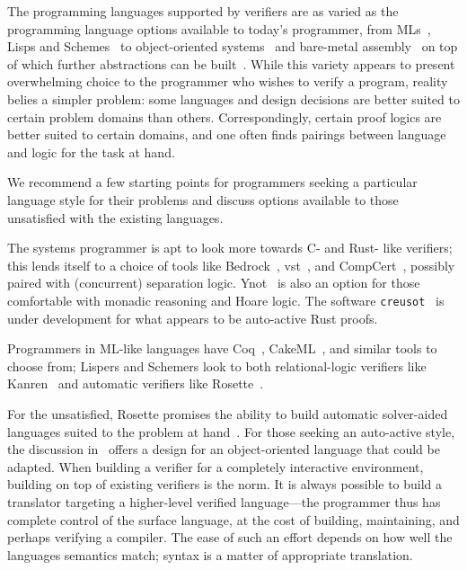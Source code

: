 The programming languages supported by verifiers are as varied as the
programming language options available to today's programmer, from
MLs~\cite{Coq,Kumar_2014}, Lisps and Schemes~\cite{Torlak_2013} to
object-oriented systems~\cite{leino2008specification,leino2010dafny} and
bare-metal assembly~\cite{Chlipala_2011} on top of which further abstractions
can be built~\cite{Chlipala_2015}. While this variety appears to present
overwhelming choice to the programmer who wishes to verify a program, reality
belies a simpler problem: some languages and design decisions are better suited
to certain problem domains than others. Correspondingly, certain proof logics
are better suited to certain domains, and one often finds pairings between
language and logic for the task at hand.

We recommend a few starting points for programmers seeking a particular language
style for their problems and discuss options available to those unsatisfied with
the existing languages.

The systems programmer is apt to look more towards C- and Rust- like verifiers; this
lends itself to a choice of tools like Bedrock~\cite{Chlipala_2011},
\gls{vst}~\cite{VST}, and CompCert~\cite{Kastner-LBSSF-2017}, possibly paired
with (concurrent) separation logic. Ynot~\cite{Nanevski08ynot:reasoning} is also
an option for those comfortable with monadic reasoning and Hoare logic. The
software \texttt{creusot}~\cite{creusot} is under development for what appears
to be auto-active Rust proofs.

Programmers in ML-like languages have Coq~\cite{Coq}, CakeML~\cite{Kumar_2014},
and similar tools to choose from; Lispers and Schemers look to both
relational-logic verifiers like Kanren~\cite{Byrd_2009} and automatic verifiers
like Rosette~\cite{Rosette}.

For the unsatisfied, Rosette promises the ability to build automatic
solver-aided languages suited to the problem at hand~\cite{Torlak_2013}. For
those seeking an auto-active style, the discussion
in~\cite{leino2008specification,Ahmadi_2014} offers a design for an
object-oriented language that could be adapted. When building a verifier for a
completely interactive environment, building on top of existing verifiers is the
norm. It is always possible to build a translator targeting a higher-level
verified language---the programmer thus has complete control of the surface
language, at the cost of building, maintaining, and perhaps verifying a
compiler. The ease of such an effort depends on how well the languages semantics
match; syntax is a matter of appropriate translation.
